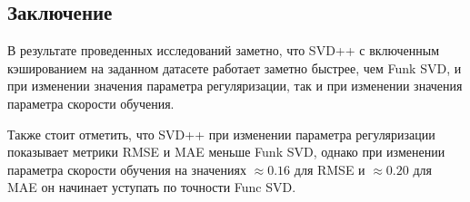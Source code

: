 \subsection*{Заключение}

В результате проведенных исследований заметно, что SVD++ с включенным кэшированием на заданном датасете работает заметно быстрее, чем Funk SVD, и при изменении значения параметра регуляризации, так и при изменении значения параметра скорости обучения.

Также стоит отметить, что SVD++ при изменении параметра регуляризации показывает метрики RMSE и MAE меньше Funk SVD, однако при изменении параметра скорости обучения на значениях $\approx 0.16$ для RMSE и $\approx 0.20$ для MAE он начинает уступать по точности Func SVD.